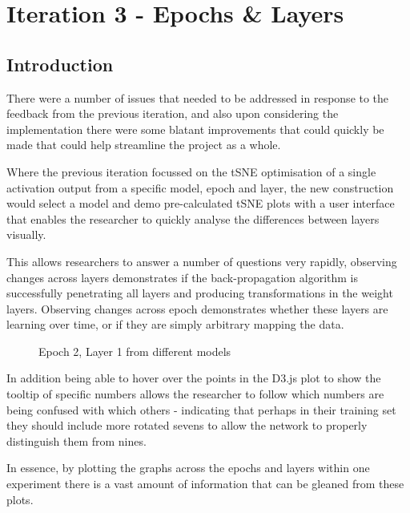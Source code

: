 \documentclass[a4paper,11pt,titlepage]{article}
\begin{document}
\clearpage 
				
\section{Iteration 3 - Epochs \& Layers}
	\subsection{Introduction}
	There were a number of issues that needed to be addressed in response to the feedback from the previous iteration, and also upon considering the implementation there were some blatant improvements that could quickly be made that could help streamline the project as a whole. 
	\par 
	Where the previous iteration focussed on the tSNE optimisation of a single activation output from a specific model, epoch and layer, the new construction would select a model and demo pre-calculated tSNE plots  with a user interface that enables the researcher to quickly analyse the differences between layers visually.
	\par 
	This allows researchers to answer a number of questions very rapidly, observing changes across layers demonstrates if the back-propagation algorithm is successfully penetrating all layers and producing transformations in the weight layers. Observing changes across epoch demonstrates whether these layers are learning over time, or if they are simply arbitrary mapping the data. 
	\par 
		
	\begin{figure}[H]
    			\caption{Epoch 2, Layer 1 from different models}%
	\end{figure}	
	
	In addition being able to hover over the points in the D3.js plot to show the tooltip of specific numbers allows the researcher to follow which numbers are being confused with which others - indicating that perhaps in their training set they should include more rotated sevens to allow the network to properly distinguish them from nines. 
	\par 
	In essence, by plotting the graphs across the epochs and layers within one experiment there is a vast amount of information that can be gleaned from these plots.
	
\end{document}
